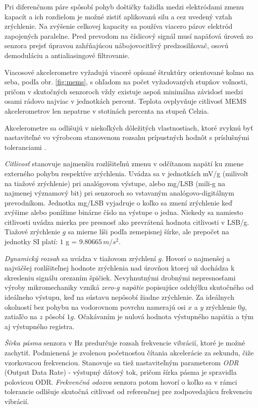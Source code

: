 Pri diferenčnom páre spôsobí pohyb doštičky ťažidla medzi elektródami zmenu kapacít a ich rozdielom je možné zistiť aplikovanú silu a
cez uvedený vzťah zrýchlenie. Na zvýšenie celkovej kapacity sa používa viacero párov elektród zapojených paralelne. Pred prevodom na
číslicový signál musí napäťová úroveň zo senzora prejsť úpravou zahŕňajúcou nábojovocitlivý predzosilňovač, osovú demoduláciu a anti\-aliasingové filtrovanie.

Viacosové akcelerometre vyžadujú viaceré opísané štruktúry orientované kolmo na seba, podľa obr. \ref{fig:mems}, s ohľadom na počet
vyžadovaných stupňov voľnosti, pričom v skutočných senzoroch vždy existuje aspoň minimálna závislosť medzi osami rádovo najviac v
jednotkách percent. Teplota ovplyvňuje citlivosť MEMS akcelerometrov len nepatrne v stotinách percenta na stupeň Celzia.

Akcelerometre sa odlišujú v niekoľkých dôležitých vlastnostiach, ktoré zvyknú byť nastaviteľné vo výrobcom stanovenom rozsahu
prípustných hodnôt s príslušnými toleranciami \cite{accelerometer-mechanics}.

\emph{Citlivosť} stanovuje najmenšiu rozlíšiteľnú zmenu v odčítanom napätí ku zmene externého pohybu respektíve zrýchlenia.
Uvádza sa v jednotkách mV/g (milivolt na tiažové zrýchlenie) pri analógovom výstupe, alebo mg/LSB (mili-g
na najmenej významový bit) pri senzoroch so vstavaným analógovo-digitálnym prevodníkom. Jednotka mg/LSB vyjadruje
o koľko sa zmení zrýchlenie keď zvýšime alebo ponížime binárne číslo na výstupe o jedna. Niekedy sa namiesto
citlivosti uvádza mierka pre presnosť ako prevrátená hodnota citlivosti v LSB/g. Tiažové zrýchlenie $g$ sa mierne líši podľa
zemepisnej šírke, ale prepočet na jednotky SI platí: $1$ g = $9.80665\,m/s^2$.

\emph{Dynamický rozsah} sa uvádza v tiažovom  zrýchlení $g$. Hovorí o najmenšej a najväčšej rozlíšiteľnej hodnote zrýchlenia nad
úrovňou ktorej už dochádza k skresleniu signálu orezaním špičiek. Nevyhnutnými drobnými nepresnosťami výroby mikromechaniky vzniká
\emph{zero-g napätie} popisujúce odchýlku skutočného od ideálneho výstupu, keď na sústavu nepôsobí žiadne zrýchlenie. Za ideálnych
okolností bez pohybu na vodorovnom povrchu namerajú osi $x$ a $y$ zrýchlenie $0g$, zatiaľčo na $z$ pôsobí $1g$. Očakávaním je nulová
hodnota výstupného napätia a tým aj výstupného registra.

\emph{Šírka pásma} senzora v Hz predurčuje rozsah frekvencie vibrácií, ktoré je možné zachytiť. Podmienená je zvolenou
početnosťou  čítania akcelerácie za sekundu, čiže vzorkovacou frekvenciou. Stanovuje sa tiež nastaviteľným parameterom \emph{ODR}
(Output Data Rate) - výstupný dátový tok, pričom šírka pásma je spravidla polovicou ODR. \emph{Frekvenčná odozva} senzora potom 
hovorí o koľko sa v rámci tolerancie odlišuje skutočná citlivosť od referenčnej pre zodpovedajúcu frekvenciu vibrácií.

